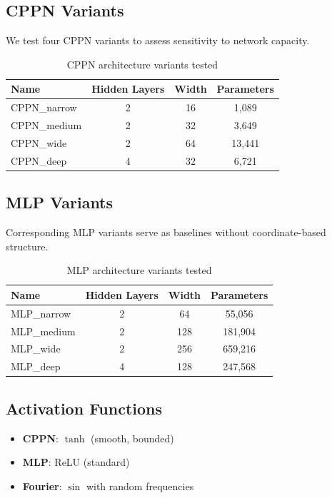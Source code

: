 \subsection{CPPN Variants}

We test four CPPN variants to assess sensitivity to network capacity.

\begin{table}[H]
\centering
\caption{CPPN architecture variants tested}
\begin{tabular}{lccc}
\toprule
Name & Hidden Layers & Width & Parameters \\
\midrule
CPPN\_narrow & 2 & 16 & 1,089 \\
CPPN\_medium & 2 & 32 & 3,649 \\
CPPN\_wide & 2 & 64 & 13,441 \\
CPPN\_deep & 4 & 32 & 6,721 \\
\bottomrule
\end{tabular}
\end{table}

\subsection{MLP Variants}

Corresponding MLP variants serve as baselines without coordinate-based structure.

\begin{table}[H]
\centering
\caption{MLP architecture variants tested}
\begin{tabular}{lccc}
\toprule
Name & Hidden Layers & Width & Parameters \\
\midrule
MLP\_narrow & 2 & 64 & 55,056 \\
MLP\_medium & 2 & 128 & 181,904 \\
MLP\_wide & 2 & 256 & 659,216 \\
MLP\_deep & 4 & 128 & 247,568 \\
\bottomrule
\end{tabular}
\end{table}

\subsection{Activation Functions}

\begin{itemize}
    \item \textbf{CPPN}: $\tanh$ (smooth, bounded)
    \item \textbf{MLP}: ReLU (standard)
    \item \textbf{Fourier}: $\sin$ with random frequencies
\end{itemize}

